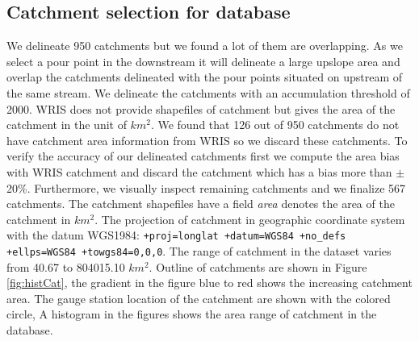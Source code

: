 \documentclass[a4paper, 12pt]{article}
\begin{document}
\subsection{Catchment selection for database} \label{sec:catSel} %
We delineate 950 catchments but we found a lot of them are overlapping. As we select a pour point in the downstream it will delineate a large upslope area and overlap the catchments delineated with the pour points situated on upstream of the same stream. We delineate the catchments with an accumulation threshold of 2000. WRIS does not provide shapefiles of catchment but gives the area of the catchment in the unit of $km^2$. We found that 126 out of 950 catchments do not have catchment area information from WRIS so we discard these catchments. To verify the accuracy of our delineated catchments first we compute the area bias with WRIS catchment and discard the catchment which has a bias more than $\pm$20\%. Furthermore, we visually inspect remaining catchments and we finalize 567 catchments. The catchment shapefiles have a field \emph{area} denotes the area of the catchment in $km^2$. The projection of catchment in geographic coordinate system with the datum WGS1984: \texttt{+proj=longlat +datum=WGS84 +no\_defs +ellps=WGS84 +towgs84=0,0,0}. The range of catchment in the dataset varies from 40.67 to 804015.10 $km^2$. Outline of catchments are shown in Figure \ref{fig:histCat}, the gradient in the figure blue to red shows the increasing catchment area. The gauge station location of the catchment are shown with the colored circle, A histogram in the figures shows the area range of catchment in the database.
\end{document}

